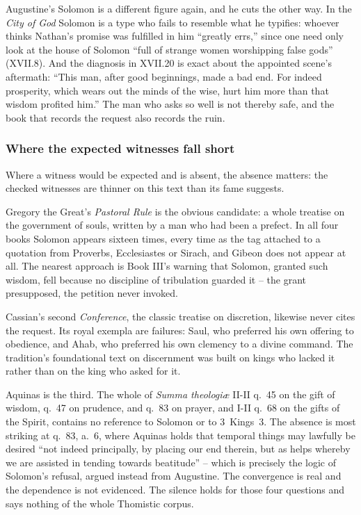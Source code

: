 Augustine's Solomon is a different figure again, and he cuts the other way. In the \emph{City of God} Solomon is a type who fails to resemble what he typifies: whoever thinks Nathan's promise was fulfilled in him ``greatly errs,'' since one need only look at the house of Solomon ``full of strange women worshipping false gods'' (XVII.8). And the diagnosis in XVII.20 is exact about the appointed scene's aftermath: ``This man, after good beginnings, made a bad end. For indeed prosperity, which wears out the minds of the wise, hurt him more than that wisdom profited him.'' The man who asks so well is not thereby safe, and the book that records the request also records the ruin.

\subsubsection*{Where the expected witnesses fall short}

Where a witness would be expected and is absent, the absence matters: the checked witnesses are thinner on this text than its fame suggests.

Gregory the Great's \emph{Pastoral Rule} is the obvious candidate: a whole treatise on the government of souls, written by a man who had been a prefect. In all four books Solomon appears sixteen times, every time as the tag attached to a quotation from Proverbs, Ecclesiastes or Sirach, and Gibeon does not appear at all. The nearest approach is Book III's warning that Solomon, granted such wisdom, fell because no discipline of tribulation guarded it -- the grant presupposed, the petition never invoked.

Cassian's second \emph{Conference}, the classic treatise on discretion, likewise never cites the request. Its royal exempla are failures: Saul, who preferred his own offering to obedience, and Ahab, who preferred his own clemency to a divine command. The tradition's foundational text on discernment was built on kings who lacked it rather than on the king who asked for it.

Aquinas is the third. The whole of \emph{Summa theologi\ae} II-II q.~45 on the gift of wisdom, q.~47 on prudence, and q.~83 on prayer, and I-II q.~68 on the gifts of the Spirit, contains no reference to Solomon or to 3~Kings~3. The absence is most striking at q.~83, a.~6, where Aquinas holds that temporal things may lawfully be desired ``not indeed principally, by placing our end therein, but as helps whereby we are assisted in tending towards beatitude'' -- which is precisely the logic of Solomon's refusal, argued instead from Augustine. The convergence is real and the dependence is not evidenced. The silence holds for those four questions and says nothing of the whole Thomistic corpus.

